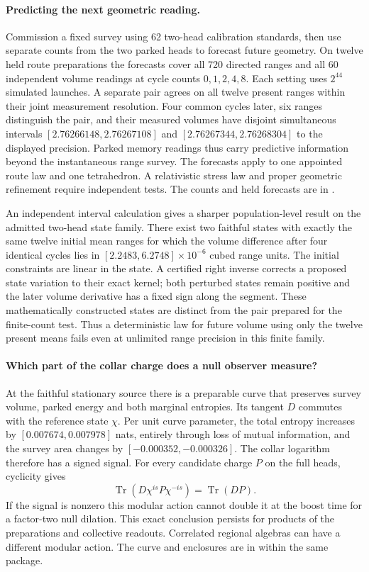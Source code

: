 \documentclass[11pt]{article}
\begin{document}
\paragraph{Predicting the next geometric reading.}
Commission a fixed survey using 62 two-head calibration standards,
then use separate counts from the two parked heads to forecast
future geometry. On twelve held route preparations the forecasts
cover all 720 directed ranges and all 60 independent volume
readings at cycle counts $0,1,2,4,8$. Each setting uses $2^{44}$
simulated launches. A separate pair agrees on all twelve present
ranges within their joint measurement resolution. Four common
cycles later, six ranges distinguish the pair, and their measured
volumes have disjoint simultaneous intervals
$[2.76266148,2.76267108]$ and $[2.76267344,2.76268304]$
to the displayed precision. Parked memory readings thus carry
predictive information beyond the instantaneous range survey.
The forecasts apply to one appointed route law and one tetrahedron.
A relativistic stress law and proper geometric refinement require
independent tests. The counts and held forecasts are in
.

An independent interval calculation gives a sharper population-level
result on the admitted two-head state family. There exist two faithful
states with exactly the same twelve initial mean ranges for which the
volume difference after four identical cycles lies in
$[2.2483,6.2748]\times10^{-6}$ cubed range units. The initial
constraints are linear in the state. A certified right inverse corrects
a proposed state variation to their exact kernel; both perturbed states
remain positive and the later volume derivative has a fixed sign along
the segment. These mathematically constructed states are distinct from
the pair prepared for the finite-count test. Thus a deterministic law
for future volume using only the twelve present means fails even at
unlimited range precision in this finite family.

\paragraph{Which part of the collar charge does a null observer measure?}
At the faithful stationary source there is a preparable curve that
preserves survey volume, parked energy and both marginal entropies.
Its tangent \(D\) commutes with the reference state \(\chi\).
Per unit curve parameter, the total entropy increases by
\([0.007674,0.007978]\) nats, entirely through loss of mutual
information, and the survey area changes by
\([-0.000352,-0.000326]\). The collar logarithm therefore has a
signed signal. For every candidate charge \(P\) on the full heads,
cyclicity gives
\[
  \operatorname{Tr}(D\chi^{is}P\chi^{-is})=\operatorname{Tr}(DP).
\]
If the signal is nonzero this modular action cannot double it at the
boost time for a factor-two null dilation. This exact conclusion
persists for products of the preparations and collective readouts.
Correlated regional algebras can have a different modular action.
The curve and enclosures are in 
within the same package.
\end{document}
